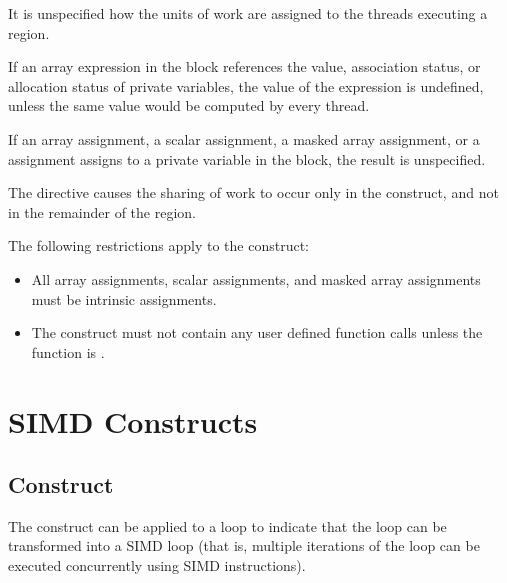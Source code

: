 It is unspecified how the units of work are assigned to the threads executing a 
 region.

If an array expression in the block references the value, association status, or allocation 
status of private variables, the value of the expression is undefined, unless the same 
value would be computed by every thread.

If an array assignment, a scalar assignment, a masked array assignment, or a  
assignment assigns to a private variable in the block, the result is unspecified.

The  directive causes the sharing of work to occur only in the  
construct, and not in the remainder of the  region.

\begin{samepage}
\restrictions
The following restrictions apply to the  construct:

\begin{itemize}
\item All array assignments, scalar assignments, and masked array assignments must be 
intrinsic assignments.

\item The construct must not contain any user defined function calls unless the function is 
.
\end{itemize}
\fortranspecificend
\end{samepage}













\filbreak
\section{SIMD Constructs}
\label{sec:SIMD Constructs}
\subsection{ Construct}
\label{subsec:simd Construct}
\summary
The  construct can be applied to a loop to indicate that the loop can be transformed 
into a SIMD loop (that is, multiple iterations of the loop can be executed concurrently 
using SIMD instructions).

